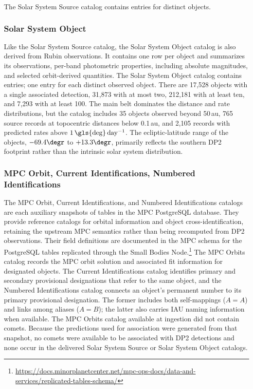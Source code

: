 The Solar System Source catalog contains \nsolarsystemsources entries for \nssobjects distinct objects.


\subsubsection{Solar System Object}
\label{sssec:SSObject}
Like the Solar System Source catalog, the \gls{Solar System Object} catalog is also derived from Rubin observations.
It contains one row per object and summarizes its observations, per-band photometric properties, including absolute magnitudes, and selected orbit-derived quantities.
The Solar System Object catalog contains \nssobjects entries; one entry for each distinct observed object.
There are 17,528 objects with a single associated detection, 31,873 with at most two, 212,181 with at least ten, and 7,293 with at least 100.
The main belt dominates the distance and rate distributions, but the catalog includes 35 objects observed beyond 50\,au, 765 source records at topocentric distances below 0.1\,au, and 2,105 records with predicted rates above
$1\mathrm{\,\gls{deg}\,day^{-1}}$.
The ecliptic-latitude range of the objects, $-69.4\degr$ to $+13.3\degr$, primarily reflects the southern \gls{DP2} footprint rather than the intrinsic solar system distribution.

\subsubsection{MPC Orbit, Current Identifications, Numbered Identifications}

The \gls{MPC} Orbit, Current Identifications, and Numbered Identifications catalogs are each auxiliary snapshots of tables in the \gls{MPC} PostgreSQL database.
They provide reference catalogs for orbital information and object cross-identification, retaining the upstream \gls{MPC} semantics rather than being recomputed from DP2 observations.
Their field definitions are documented in the \gls{MPC} schema for the PostgreSQL tables replicated through the Small Bodies Node.\footnote{\url{https://docs.minorplanetcenter.net/mpc-ops-docs/data-and-services/replicated-tables-schema/}}
The \gls{MPC} Orbits catalog records the \gls{MPC} orbit solution and associated fit information for designated objects.
The Current Identifications catalog identifies primary and secondary provisional designations that refer to the same object, and the Numbered Identifications catalog connects an object's permanent number to
its primary provisional designation.
The former includes both self-mappings ($A=A$) and links among aliases ($A=B$); the latter also carries \gls{IAU} naming information when available.
The \gls{MPC} Orbits catalog available at ingestion did not contain comets.
Because the predictions used for association were generated from that snapshot, no comets were available to be associated with \gls{DP2} detections and none occur in the delivered Solar System Source or Solar System Object catalogs.

